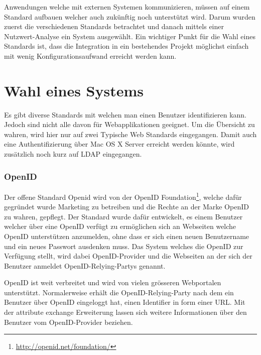 Anwendungen welche mit externen Systemen kommunizieren, müssen auf einem Standard aufbauen welcher auch zukünftig noch unterstützt wird. Darum wurden zuerst die verschiedenen Standards betrachtet und danach mittels einer Nutzwert-Analyse ein System ausgewählt. Ein wichtiger Punkt für die Wahl eines Standards ist, dass die Integration in ein bestehendes Projekt möglichst einfach mit wenig Konfigurationsaufwand erreicht werden kann.

\section{Wahl eines Systems}
\label{sec:Wahl eines Systems}
Es gibt diverse Standards mit welchen man einen Benutzer identifizieren kann. Jedoch sind nicht alle davon für Webapplikationen geeignet. Um die Übersicht zu wahren, wird hier nur auf zwei Typische Web Standards eingegangen. Damit auch eine Authentifizierung über Mac OS X Server erreicht werden könnte, wird zusätzlich noch kurz auf LDAP eingegangen.

\subsubsection{OpenID}
\label{ssub:OpenID}
Der offene Standard Openid wird von der OpenID
Foundation\footnote{\url{http://openid.net/foundation/}}, welche dafür gegründet wurde Marketing zu betreiben und die Rechte an der Marke OpenID zu wahren, gepflegt. Der Standard wurde dafür entwickelt, es einem Benutzer welcher über eine OpenID verfügt zu ermöglichen sich an Webseiten welche OpenID unterstützen anzumelden, ohne dass er sich einen neuen Benutzername und ein neues Passwort ausdenken muss. Das System welches die OpenID zur Verfügung stellt, wird dabei \gls{OpenID-Provider} und die Webseiten an der sich der Benutzer anmeldet \glspl{OpenID-Relying-Party} genannt.

OpenID ist weit verbreitet und wird von vielen grösseren Webportalen unterstützt. Normalerweise erhält die \gls{OpenID-Relying-Party} nach dem ein Benutzer über OpenID eingeloggt hat, einen Identifier in form einer URL. Mit der attribute exchange Erweiterung lassen sich weitere Informationen über den Benutzer vom \gls{OpenID-Provider} beziehen.

